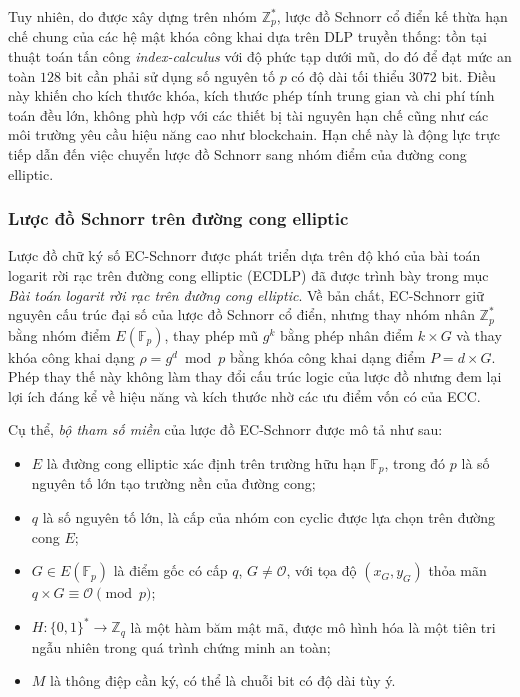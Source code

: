 Tuy nhiên, do được xây dựng trên nhóm $\mathbb{Z}_p^*$, lược đồ Schnorr cổ điển kế thừa hạn chế chung của các hệ mật khóa công khai dựa trên DLP truyền thống: tồn tại thuật toán tấn công \textit{index-calculus} với độ phức tạp dưới mũ, do đó để đạt mức an toàn $128$ bit cần phải sử dụng số nguyên tố $p$ có độ dài tối thiểu $3072$ bit. Điều này khiến cho kích thước khóa, kích thước phép tính trung gian và chi phí tính toán đều lớn, không phù hợp với các thiết bị tài nguyên hạn chế cũng như các môi trường yêu cầu hiệu năng cao như blockchain. Hạn chế này là động lực trực tiếp dẫn đến việc chuyển lược đồ Schnorr sang nhóm điểm của đường cong elliptic.

\subsubsection{Lược đồ Schnorr trên đường cong elliptic}

Lược đồ chữ ký số EC-Schnorr được phát triển dựa trên độ khó của bài toán logarit rời rạc trên đường cong elliptic (ECDLP) đã được trình bày trong mục \textit{Bài toán logarit rời rạc trên đường cong elliptic}. Về bản chất, EC-Schnorr giữ nguyên cấu trúc đại số của lược đồ Schnorr cổ điển, nhưng thay nhóm nhân $\mathbb{Z}_p^*$ bằng nhóm điểm $E(\mathbb{F}_p)$, thay phép mũ $g^k$ bằng phép nhân điểm $k \times G$ và thay khóa công khai dạng $\rho = g^d \bmod p$ bằng khóa công khai dạng điểm $P = d \times G$. Phép thay thế này không làm thay đổi cấu trúc logic của lược đồ nhưng đem lại lợi ích đáng kể về hiệu năng và kích thước nhờ các ưu điểm vốn có của ECC.

Cụ thể, \textit{bộ tham số miền} của lược đồ EC-Schnorr được mô tả như sau:

\begin{itemize}
    \item $E$ là đường cong elliptic xác định trên trường hữu hạn $\mathbb{F}_p$, trong đó $p$ là số nguyên tố lớn tạo trường nền của đường cong;
    \item $q$ là số nguyên tố lớn, là cấp của nhóm con cyclic được lựa chọn trên đường cong $E$;
    \item $G \in E(\mathbb{F}_p)$ là điểm gốc có cấp $q$, $G \neq \mathcal{O}$, với tọa độ $(x_G, y_G)$ thỏa mãn $q \times G \equiv \mathcal{O} \pmod{p}$;
    \item $H: \{0,1\}^* \rightarrow \mathbb{Z}_q$ là một hàm băm mật mã, được mô hình hóa là một tiên tri ngẫu nhiên trong quá trình chứng minh an toàn;
    \item $M$ là thông điệp cần ký, có thể là chuỗi bit có độ dài tùy ý.
\end{itemize}

